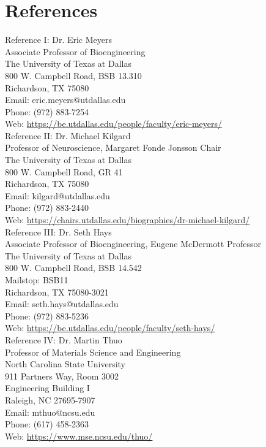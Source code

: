 \documentclass[11pt,a4paper,sans]{moderncv}        %
\begin{document}
\section{References}
{

Reference I: Dr. Eric Meyers\\
Associate Professor of Bioengineering\\
The University of Texas at Dallas\\
800 W. Campbell Road, BSB 13.310\\
Richardson, TX 75080\\
Email: eric.meyers@utdallas.edu\\
Phone: (972) 883-7254\\
Web: \url{https://be.utdallas.edu/people/faculty/eric-meyers/}\\

Reference II: Dr. Michael Kilgard\\
Professor of Neuroscience, Margaret Fonde Jonsson Chair\\
The University of Texas at Dallas\\
800 W. Campbell Road, GR 41\\
Richardson, TX 75080\\
Email: kilgard@utdallas.edu\\
Phone: (972) 883-2440\\
Web: \url{https://chairs.utdallas.edu/biographies/dr-michael-kilgard/}\\

Reference III: Dr. Seth Hays\\
Associate Professor of Bioengineering, Eugene McDermott Professor\\
The University of Texas at Dallas\\
800 W. Campbell Road, BSB 14.542\\
Mailstop: BSB11\\
Richardson, TX 75080-3021\\
Email: seth.hays@utdallas.edu\\
Phone: (972) 883-5236\\
Web: \url{https://be.utdallas.edu/people/faculty/seth-hays/}\\

Reference IV: Dr. Martin Thuo\\
Professor of Materials Science and Engineering\\
North Carolina State University\\
911 Partners Way, Room 3002\\
Engineering Building I\\
Raleigh, NC 27695-7907\\
Email: mthuo@ncsu.edu\\
Phone: (617) 458-2363\\
Web: \url{https://www.mse.ncsu.edu/thuo/}\\

}
\end{document}

